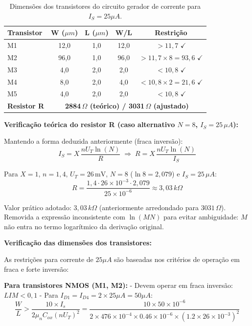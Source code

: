 ﻿\documentclass[12pt,a4paper]{article}
\begin{document}
\begin{table}[H]
\centering
\caption{Dimensões dos transistores do circuito gerador de corrente para $I_S = 25\mu A$.}
\label{tab:dimensoes}
\begin{tabular}{@{}lcccc@{}}
\toprule
\textbf{Transistor} & \textbf{W ($\mu m$)} & \textbf{L ($\mu m$)} & \textbf{W/L} & \textbf{Restrição} \\ \midrule
M1 & 12,0 & 1,0 & 12,0 & $> 11,7$ $\checkmark$ \\
M2 & 96,0 & 1,0 & 96,0 & $> 11,7 \times 8 = 93,6$ $\checkmark$ \\
M3 & 4,0 & 2,0 & 2,0 & $< 10,8$ $\checkmark$ \\
M4 & 8,0 & 2,0 & 4,0 & $< 10,8 \times 2 = 21,6$ $\checkmark$ \\
M5 & 4,0 & 2,0 & 2,0 & $< 10,8$ $\checkmark$ \\
\textbf{Resistor R} & \multicolumn{4}{c}{\textbf{2884\,$\Omega$ (teórico) / 3031\,$\Omega$ (ajustado)}} \\ \bottomrule
\end{tabular}
\end{table}

	\textbf{Verificação teórica do resistor R (caso alternativo $N=8$, $I_S=25\,\mu A$):}

Mantendo a forma deduzida anteriormente (fraca inversão):
$$ I_S = X\,\frac{n U_T \ln(N)}{R} \;\Longrightarrow\; R = X\,\frac{n U_T \ln(N)}{I_S} $$

Para $X=1$, $n=1{,}4$, $U_T=26\,\text{mV}$, $N=8$ ($\ln 8 = 2{,}079$) e $I_S=25\,\mu A$:
$$ R = \frac{1{,}4 \cdot 26\times10^{-3} \cdot 2{,}079}{25\times10^{-6}} \approx 3{,}03\,k\Omega $$

Valor prático adotado: $3{,}03\,k\Omega$ (anteriormente arredondado para $3031\,\Omega$). Removida a expressão inconsistente com $\ln(MN)$ para evitar ambiguidade: $M$ não entra no termo logarítmico da derivação original.

\textbf{Verificação das dimensões dos transistores:}

As restrições para corrente de $25\mu A$ são baseadas nos critérios de operação em fraca e forte inversão:

\textbf{Para transistores NMOS (M1, M2):} 
- Devem operar em fraca inversão: $LIM < 0,1$
- Para $I_{D1} = I_{D4} = 2 \times 25\mu A = 50\mu A$:
$$\frac{W}{L} > \frac{10 \times I_s}{2\mu_n C_{ox} (nU_T)^2} = \frac{10 \times 50 \times 10^{-6}}{2 \times 476 \times 10^{-4} \times 0.46 \times 10^{-6} \times (1.2 \times 26 \times 10^{-3})^2}$$
\end{document}
